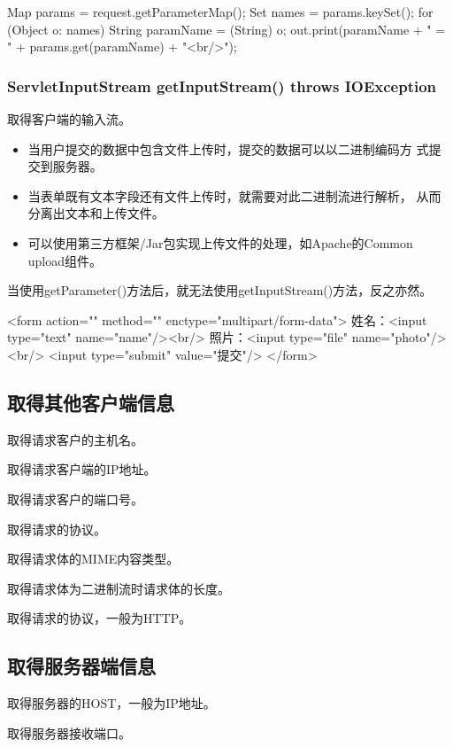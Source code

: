 \begin{javaCode}
  Map params = request.getParameterMap();
  Set names = params.keySet();
  for (Object o: names) {
    String paramName = (String) o;
    out.print(paramName + " = " + params.get(paramName) + "<br/>");
  }
\end{javaCode}

\subsubsection{ServletInputStream getInputStream() throws IOException}

取得客户端的输入流。

\begin{itemize}
\item 当用户提交的数据中包含文件上传时，提交的数据可以以二进制编码方
  式提交到服务器。
\item 当表单既有文本字段还有文件上传时，就需要对此二进制流进行解析，
  从而分离出文本和上传文件。
\item 可以使用第三方框架/Jar包实现上传文件的处理，如{\kai\Blue Apache的Common
    upload组件}。
\end{itemize}


{\kai 当使用getParameter()方法后，就无法使用getInputStream()方法，反之亦然。}

\begin{xmlCode}
  <form action="" method="" enctype="multipart/form-data">
    姓名：<input type="text" name="name"/><br/>
    照片：<input type="file" name="photo"/><br/>
    <input type="submit" value="提交"/>
  </form>
\end{xmlCode}

\subsection{取得其他客户端信息} 

 取得请求客户的主机名。

 取得请求客户端的IP地址。

 取得请求客户的端口号。

 取得请求的协议。

 取得请求体的MIME内容类型。

 取得请求体为二进制流时请求体的长度。

 取得请求的协议，一般为HTTP。

\subsection{取得服务器端信息} 

 取得服务器的HOST，一般为IP地址。

 取得服务器接收端口。

